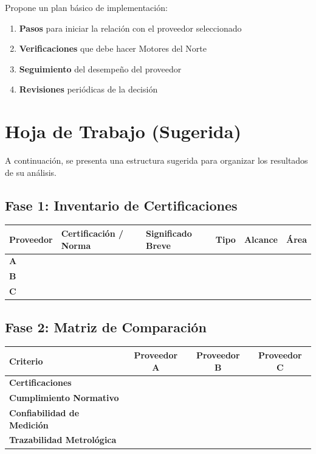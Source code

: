 \documentclass{article}
\begin{document}
Propone un plan básico de implementación:
\begin{enumerate}
    \item \textbf{Pasos} para iniciar la relación con el proveedor seleccionado
    \item \textbf{Verificaciones} que debe hacer Motores del Norte
    \item \textbf{Seguimiento} del desempeño del proveedor
    \item \textbf{Revisiones} periódicas de la decisión
\end{enumerate}

\section*{Hoja de Trabajo (Sugerida)}

A continuación, se presenta una estructura sugerida para organizar los resultados de su análisis.

\subsection*{Fase 1: Inventario de Certificaciones}

\begin{tabular}{|l|l|l|l|l|l|}
\hline
\textbf{Proveedor} & \textbf{Certificación / Norma} & \textbf{Significado Breve} & \textbf{Tipo} & \textbf{Alcance} & \textbf{Área} \\
\hline
\textbf{A} & & & & & \\
\textbf{B} & & & & & \\
\textbf{C} & & & & & \\
\hline
\end{tabular}

\subsection*{Fase 2: Matriz de Comparación}

\begin{tabular}{|l|c|c|c|}
\hline
\textbf{Criterio} & \textbf{Proveedor A} & \textbf{Proveedor B} & \textbf{Proveedor C} \\
\hline
\textbf{Certificaciones} & & & \\
\textbf{Cumplimiento Normativo} & & & \\
\textbf{Confiabilidad de Medición} & & & \\
\textbf{Trazabilidad Metrológica} & & & \\
\hline
\end{tabular}
\end{document}
